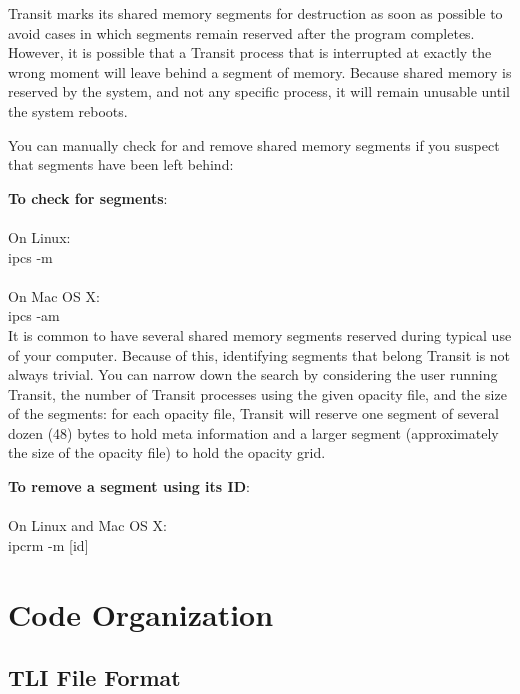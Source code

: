 \documentclass[letterpaper, 12pt]{article}
\begin{document}
Transit marks its shared memory segments for destruction as soon as
possible to avoid cases in which segments remain reserved after the
program completes. However, it is possible that a Transit process that
is interrupted at exactly the wrong moment will leave behind a segment
of memory. Because shared memory is reserved by the system, and not
any specific process, it will remain unusable until the system reboots.

You can manually check for and remove shared memory segments if you
suspect that segments have been left behind: \newline

\noindent
{\bf To check for segments}: \\
\\
On Linux: \\
{\tttm ipcs -m} \\
\\
On Mac OS X: \\
{\tttm ipcs -am} \\

\medskip
It is common to have several shared memory segments reserved during typical
use of your computer. Because of this, identifying segments that belong
Transit is not always trivial. You can narrow down the search by considering
the user running Transit, the number of Transit processes using the given
opacity file, and the size of the segments: for each opacity file, Transit
will reserve one segment of several dozen (48) bytes to hold meta information
and a larger segment (approximately the size of the opacity file) to hold
the opacity grid. \newline

\noindent
{\bf To remove a segment using its ID}: \\
\\
On Linux and Mac OS X: \\
{\tttm ipcrm -m [id]} \\


\section{Code Organization}
\label{sec:organization}


\subsection{TLI File Format}
\end{document}
